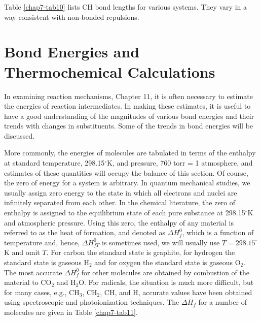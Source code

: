 Table \ref{chap7-tab10} lists CH bond lengths for various systems.
They vary in a way consistent with non-bonded repulsions.

\section{Bond Energies and Thermochemical Calculations}

In examining reaction mechanisms, Chapter 11, it is often 
necessary to estimate the energies of reaction intermediates.  In 
making these estimates, it is useful to have a good understanding 
of the magnitudes of various bond energies and their trends with 
changes in substituents.  Some of the trends in bond energies will 
be discussed.

More commonly, the energies of molecules are tabulated in terms 
of the enthalpy at standard temperature, 298.15$^{\circ}$K, and pressure, 
760 torr = 1 atmosphere, and estimates of these quantities will 
occupy the balance of this section.  Of course, the zero of energy 
for a system is arbitrary.  In quantum mechanical studies, we usually 
assign zero energy to the state in which all electrons and nuclei 
are infinitely separated from each other.  In the chemical 
literature, the zero of enthalpy is assigned to the equilibrium 
state of each pure substance at 298.15$^{\circ}$K and atmospheric 
pressure.  Using this zero, the enthalpy of any material is 
referred to as the heat of formation, and denoted as $\Delta H^0_f$, 
which is a function of temperature and, hence, $\Delta H^0_{fT}$ is
sometimes used, we will usually use $T = 298.15^{\circ}$K and omit 
$T$.  For carbon the standard state is graphite, for hydrogen the 
standard state is gaseous H$_2$
and for oxygen the standard state is gaseous O$_2$.  The most accurate 
$\Delta H^0_f$ for other molecules are obtained by combustion of the 
material to CO$_2$ and H$_2$O.  For radicals, the situation is
much more difficult, but for many cases, e.g., CH$_3$, CH$_2$, 
CH, and H, accurate values have been obtained using 
spectroscopic and photoionization techniques.  The $\Delta H_f$
for a number of molecules are given in Table \ref{chap7-tab11}.

